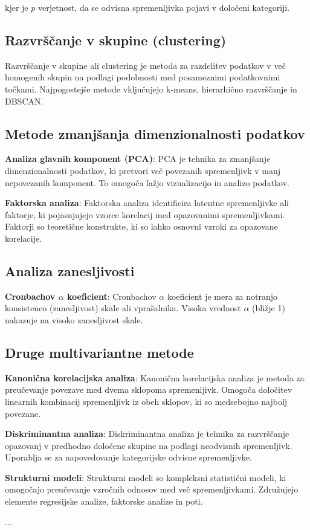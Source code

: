 kjer je $p$ verjetnost, da se odvisna spremenljivka pojavi v določeni kategoriji.

\subsection*{Razvrščanje v skupine (clustering)}

Razvrščanje v skupine ali clustering je metoda za razdelitev podatkov v več homogenih skupin na podlagi podobnosti med posameznimi podatkovnimi točkami. Najpogostejše metode vključujejo k-means, hierarhično razvrščanje in DBSCAN.

\subsection*{Metode zmanjšanja dimenzionalnosti podatkov}

\textbf{Analiza glavnih komponent (PCA)}:
PCA je tehnika za zmanjšanje dimenzionalnosti podatkov, ki pretvori več povezanih spremenljivk v manj nepovezanih komponent. To omogoča lažjo vizualizacijo in analizo podatkov.

\textbf{Faktorska analiza}:
Faktorska analiza identificira latentne spremenljivke ali faktorje, ki pojasnjujejo vzorce korelacij med opazovanimi spremenljivkami. Faktorji so teoretične konstrukte, ki so lahko osnovni vzroki za opazovane korelacije.

\subsection*{Analiza zanesljivosti}

\textbf{Cronbachov $\alpha$ koeficient}:
Cronbachov $\alpha$ koeficient je mera za notranjo konsistenco (zanesljivost) skale ali vprašalnika. Visoka vrednost $\alpha$ (bližje 1) nakazuje na visoko zanesljivost skale.

\subsection*{Druge multivariantne metode}

\textbf{Kanonična korelacijska analiza}:
Kanonična korelacijska analiza je metoda za preučevanje povezave med dvema sklopoma spremenljivk. Omogoča določitev linearnih kombinacij spremenljivk iz obeh sklopov, ki so medsebojno najbolj povezane.

\textbf{Diskriminantna analiza}:
Diskriminantna analiza je tehnika za razvrščanje opazovanj v predhodno določene skupine na podlagi neodvisnih spremenljivk. Uporablja se za napovedovanje kategorijske odvisne spremenljivke.

\textbf{Strukturni modeli}:
Strukturni modeli so kompleksni statistični modeli, ki omogočajo preučevanje vzročnih odnosov med več spremenljivkami. Združujejo elemente regresijske analize, faktorske analize in poti.

\begin{Vaje}{1}
    ...
\end{Vaje}